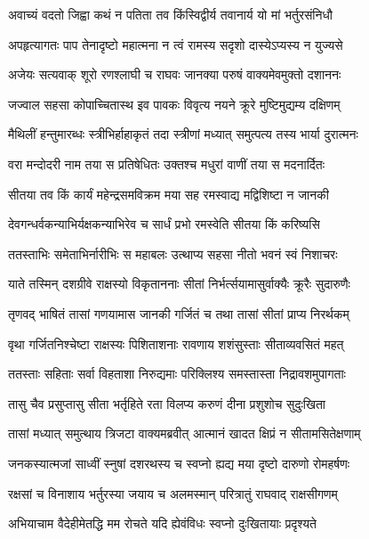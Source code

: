 \twolineshloka
{अवाच्यं वदतो जिह्वा कथं न पतिता तव}
{किंस्विद्वीर्य तवानार्य यो मां भर्तुरसंनिधौ} %

\twolineshloka
{अपहृत्यागतः पाप तेनादृष्टो महात्मना}
{न त्वं रामस्य सदृशो दास्येऽप्यस्य न युज्यसे} %

\twolineshloka
{अजेयः सत्यवाक् शूरो रणश्लाघी च राघवः}
{जानक्या परुषं वाक्यमेवमुक्तो दशाननः} %

\twolineshloka
{जज्वाल सहसा कोपाच्चितास्थ इव पावकः}
{विवृत्य नयने क्रूरे मुष्टिमुद्यम्य दक्षिणम्} %

\twolineshloka
{मैथिलीं हन्तुमारब्धः स्त्रीभिर्हाहाकृतं तदा}
{स्त्रीणां मध्यात् समुत्पत्य तस्य भार्या दुरात्मनः} %

\twolineshloka
{वरा मन्दोदरी नाम तया स प्रतिषेधितः}
{उक्तश्च मधुरां वाणीं तया स मदनार्दितः} %

\twolineshloka
{सीतया तव किं कार्यं महेन्द्रसमविक्रम}
{मया सह रमस्वाद्य मद्विशिष्टा न जानकी} %

\twolineshloka
{देवगन्धर्वकन्याभिर्यक्षकन्याभिरेव च}
{सार्धं प्रभो रमस्वेति सीतया किं करिष्यसि} %

\twolineshloka
{ततस्ताभिः समेताभिर्नारीभिः स महाबलः}
{उत्थाप्य सहसा नीतो भवनं स्वं निशाचरः} %

\twolineshloka
{याते तस्मिन् दशग्रीवे राक्षस्यो विकृताननाः}
{सीतां निर्भर्त्सयामासुर्वाक्यैः क्रूरैः सुदारुणैः} %

\twolineshloka
{तृणवद् भाषितं तासां गणयामास जानकी}
{गर्जितं च तथा तासां सीतां प्राप्य निरर्थकम्} %

\twolineshloka
{वृथा गर्जितनिश्चेष्टा राक्षस्यः पिशिताशनाः}
{रावणाय शशंसुस्ताः सीताव्यवसितं महत्} %

\twolineshloka
{ततस्ताः सहिताः सर्वा विहताशा निरुद्यमाः}
{परिक्लिश्य समस्तास्ता निद्रावशमुपागताः} %

\twolineshloka
{तासु चैव प्रसुप्तासु सीता भर्तृहिते रता}
{विलप्य करुणं दीना प्रशुशोच सुदुःखिता} %

\twolineshloka
{तासां मध्यात् समुत्थाय त्रिजटा वाक्यमब्रवीत्}
{आत्मानं खादत क्षिप्रं न सीतामसितेक्षणाम्} %

\twolineshloka
{जनकस्यात्मजां साध्वीं स्नुषां दशरथस्य च}
{स्वप्नो ह्यद्य मया दृष्टो दारुणो रोमहर्षणः} %

\twolineshloka
{रक्षसां च विनाशाय भर्तुरस्या जयाय च}
{अलमस्मान् परित्रातुं राघवाद् राक्षसीगणम्} %

\twolineshloka
{अभियाचाम वैदेहीमेतद्धि मम रोचते}
{यदि ह्येवंविधः स्वप्नो दुःखितायाः प्रदृश्यते} %

